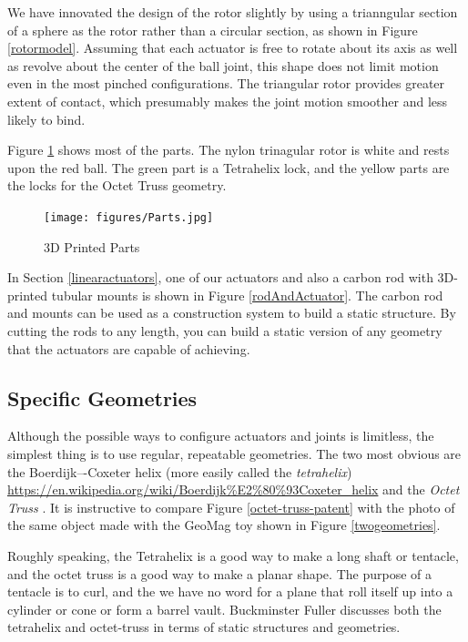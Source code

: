 \documentclass[11pt]{article}
\begin{document}
 We have innovated the design of the rotor slightly by using a trianngular section of a sphere as the
 rotor rather than a circular section, as shown in Figure \ref{rotormodel}.
 Assuming that each actuator is free to rotate about its axis as well as revolve about the
 center of the ball joint, this shape does not limit motion even in the most pinched
 configurations. The triangular rotor provides greater extent of contact,
 which presumably makes the joint motion
 smoother and less likely to bind.
 

 Figure \ref{parts} shows most of the parts. The nylon trinagular rotor is white and rests upon
 the red ball. The green part is a Tetrahelix lock, and the yellow parts are the locks for the Octet Truss
 geometry.

\begin{figure}[H]
  \centering
    \texttt{[image: figures/Parts.jpg]}
    \caption[3D Printed Parts]{3D Printed Parts}
      \label{parts}
\end{figure}

In Section \ref{linearactuators}, one of our actuators and also a carbon rod with 3D-printed tubular mounts
is shown in Figure \ref{rodAndActuator}.
The carbon rod and mounts can be used as a construction system to build a static structure.
By cutting the rods to any length, you can build a static version of any geometry that the actuators
are capable of achieving.

\subsection{Specific Geometries}

Although the possible ways to configure actuators and joints is limitless, the simplest thing is to
use regular, repeatable geometries. The two most obvious are the Boerdijk–-Coxeter helix
(more easily called the \textit{tetrahelix})
\url{https://en.wikipedia.org/wiki/Boerdijk%E2%80%93Coxeter_helix}
  and the \emph{Octet Truss}
  \cite{richard1961synergetic}.
  It is instructive to compare Figure \ref{octet-truss-patent} with the photo of the same object
  made with the GeoMag toy shown in Figure \ref{twogeometries}.
    
Roughly speaking, the Tetrahelix is a good way to make a long shaft or tentacle, and the octet truss
is a good way to make a planar shape. The purpose of a tentacle is to curl, and the we have no word for
a plane that roll itself up into a cylinder or cone or form a barrel vault. Buckminster Fuller discusses
both the tetrahelix and octet-truss \cite{fuller1982synergetics} in terms of static structures and geometries.
\end{document}
